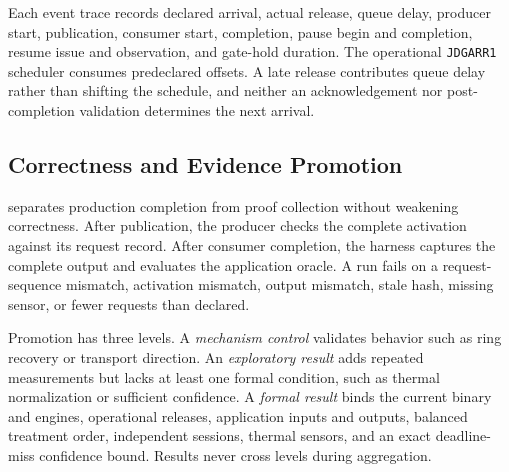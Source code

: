 Each event trace records declared arrival, actual release, queue delay,
producer start, publication, consumer start, completion, pause begin and
completion, resume issue and observation, and gate-hold duration.  The
operational \texttt{JDGARR1} scheduler consumes predeclared offsets.  A late
release contributes queue delay rather than shifting the schedule, and neither
an acknowledgement nor post-completion validation determines the next
arrival.

\subsection{Correctness and Evidence Promotion}
\label{sec:evidence}

\sys separates production completion from proof collection without weakening
correctness.  After publication, the producer checks the complete activation
against its request record.  After consumer completion, the harness captures
the complete output and evaluates the application oracle.  A run fails on a
request-sequence mismatch, activation mismatch, output mismatch, stale hash,
missing sensor, or fewer requests than declared.

Promotion has three levels.  A \emph{mechanism control} validates behavior
such as ring recovery or transport direction.  An \emph{exploratory result}
adds repeated measurements but lacks at least one formal condition, such as
thermal normalization or sufficient confidence.  A \emph{formal result} binds
the current binary and engines, operational releases, application inputs and
outputs, balanced treatment order, independent sessions, thermal sensors, and
an exact deadline-miss confidence bound.  Results never cross levels during
aggregation.
